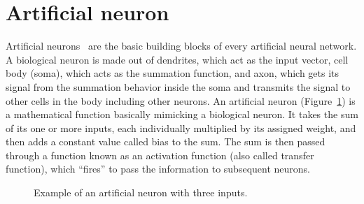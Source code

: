 \section{Artificial neuron}
\label{artificial-neuron}
Artificial neurons~\cite[p. 5]{Suzuki_11} are the basic building blocks of every artificial neural network.
A biological neuron is made out of dendrites, which act as the input vector,
cell body (soma), which acts as the summation function, and axon, which gets its signal from the summation behavior
inside the soma and transmits the signal to other cells in the body including other neurons.
An artificial neuron (Figure~\ref{fig:artificial-neuron})
is a mathematical function basically mimicking a biological neuron.
It takes the sum of its one or more inputs, each individually multiplied by its assigned weight,
and then adds a constant value called bias to the sum. The sum is then passed through
a function known as an activation function (also called transfer function), which ``fires''
to pass the information to subsequent neurons.
\begin{figure}[!ht]
    \centering
    \caption{Example of an artificial neuron with three inputs.}
    \label{fig:artificial-neuron}
\end{figure}

